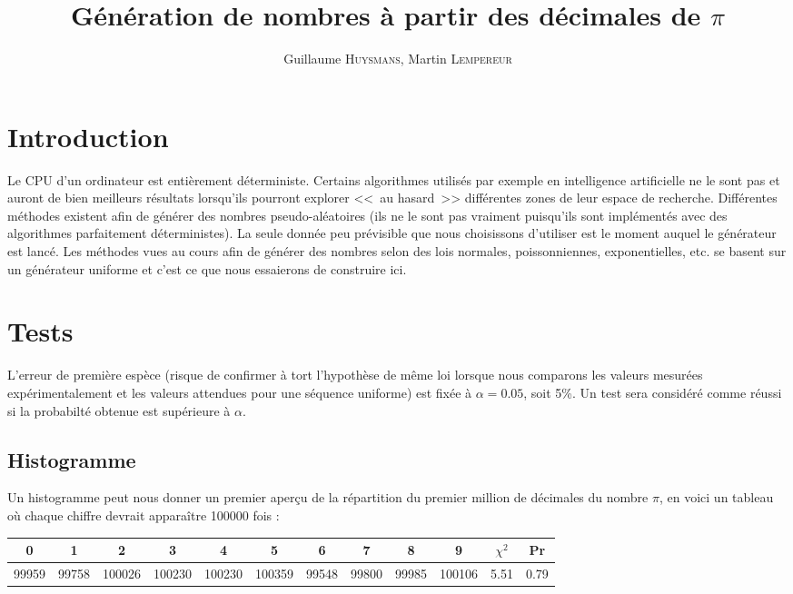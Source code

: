 \documentclass[12pt,a4paper]{article}
\author{Guillaume \textsc{Huysmans}, Martin \textsc{Lempereur}}
\title{Génération de nombres à partir des décimales de $\pi$}
\begin{document}
\maketitle

\section{Introduction}
Le CPU d'un ordinateur est entièrement déterministe. Certains algorithmes
utilisés par exemple en intelligence artificielle ne le sont pas et auront de
bien meilleurs résultats lorsqu'ils pourront explorer <<~au hasard~>> différentes
zones de leur espace de recherche. Différentes méthodes existent afin de générer
des nombres pseudo-aléatoires (ils ne le sont pas vraiment puisqu'ils sont
implémentés avec des algorithmes parfaitement déterministes). La seule donnée
peu prévisible que nous choisissons d'utiliser est le moment auquel le générateur
est lancé.
Les méthodes vues au cours afin de générer des nombres selon des lois normales,
poissonniennes, exponentielles, etc. se basent sur un générateur uniforme et
c'est ce que nous essaierons de construire ici. 

\section{Tests}
L'erreur de première espèce (risque de confirmer à tort l'hypothèse de même loi
lorsque nous comparons les valeurs mesurées expérimentalement et les valeurs
attendues pour une séquence uniforme)
est fixée à $\alpha=0.05$, soit 5\%.
Un test sera considéré comme réussi si la probabilté obtenue est supérieure à $\alpha$.

\subsection{Histogramme}
Un histogramme peut nous donner un premier aperçu de la répartition
du premier million de décimales du nombre $\pi$, en voici un tableau
où chaque chiffre devrait apparaître 100000 fois :

\begin{center}
\begin{tabular}{c|c|c|c|c|c|c|c|c|c|c|c}
0 & 1 & 2 & 3 & 4 & 5 & 6 & 7 & 8 & 9 & $\chi^2$ & Pr \\ \hline
99959 & 99758 & 100026 & 100230 & 100230 &
100359 & 99548 & 99800 & 99985 & 100106 &
5.51 & 0.79
\end{tabular}
\end{center}
\end{document}
